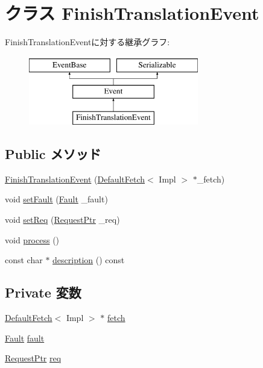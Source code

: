 \hypertarget{classDefaultFetch_1_1FinishTranslationEvent}{
\section{クラス FinishTranslationEvent}
\label{classDefaultFetch_1_1FinishTranslationEvent}
}
FinishTranslationEventに対する継承グラフ:\begin{figure}[H]
\begin{center}
\leavevmode
\includegraphics[height=3cm]{classDefaultFetch_1_1FinishTranslationEvent}
\end{center}
\end{figure}
\subsection*{Public メソッド}
\begin{DoxyCompactItemize}
\item 
\hyperlink{classDefaultFetch_1_1FinishTranslationEvent_ac469405b6804676934aeb537f7c19dc5}{FinishTranslationEvent} (\hyperlink{classDefaultFetch}{DefaultFetch}$<$ Impl $>$ $\ast$\_\-fetch)
\item 
void \hyperlink{classDefaultFetch_1_1FinishTranslationEvent_a82a42da62f864cd0227ac4b7596709a7}{setFault} (\hyperlink{classRefCountingPtr}{Fault} \_\-fault)
\item 
void \hyperlink{classDefaultFetch_1_1FinishTranslationEvent_aa90c345490b78a0a0d46cbdd6e4d61a6}{setReq} (\hyperlink{classRequest}{RequestPtr} \_\-req)
\item 
void \hyperlink{classDefaultFetch_1_1FinishTranslationEvent_a2e9c5136d19b1a95fc427e0852deab5c}{process} ()
\item 
const char $\ast$ \hyperlink{classDefaultFetch_1_1FinishTranslationEvent_a2bd90422eece9190794479e08092a252}{description} () const 
\end{DoxyCompactItemize}
\subsection*{Private 変数}
\begin{DoxyCompactItemize}
\item 
\hyperlink{classDefaultFetch}{DefaultFetch}$<$ Impl $>$ $\ast$ \hyperlink{classDefaultFetch_1_1FinishTranslationEvent_a10f1a41fdcff6e7574a83b020d3c1a91}{fetch}
\item 
\hyperlink{classRefCountingPtr}{Fault} \hyperlink{classDefaultFetch_1_1FinishTranslationEvent_a68714ceb74c60ea7ef5dec335bb6c5d7}{fault}
\item 
\hyperlink{classRequest}{RequestPtr} \hyperlink{classDefaultFetch_1_1FinishTranslationEvent_a956cd41d82347558b9c0a5b0474903f2}{req}
\end{DoxyCompactItemize}

